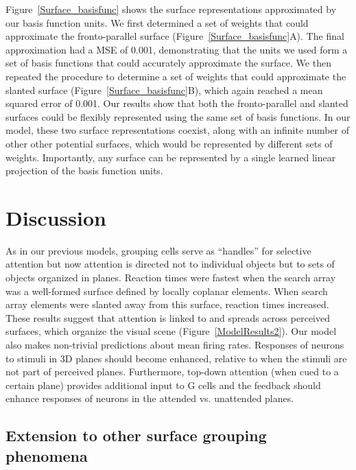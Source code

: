 Figure~\ref{Surface_basisfunc} shows the surface representations approximated by our basis function units. We first determined a set of weights that could approximate the fronto-parallel surface (Figure~\ref{Surface_basisfunc}A). The final approximation had a MSE of 0.001, demonstrating that the units we used form a set of basis functions that could accurately approximate the surface. We then repeated the procedure to determine a set of weights that could approximate the slanted surface (Figure~\ref{Surface_basisfunc}B), which again reached a mean squared error of 0.001. Our results show that both the fronto-parallel and slanted surfaces could be flexibly represented using the same set of basis functions. In our model, these two surface representations coexist, along with an infinite number of other other potential surfaces, which would be represented by different sets of weights. Importantly, any surface can be represented by a single learned linear projection of the basis function units.

\section{Discussion}

As in our previous models, grouping cells serve as “handles” for selective attention but now attention is directed not to individual objects but to sets of objects organized in planes. Reaction times were fastest when the search array was a well-formed surface defined by locally coplanar elements. When search array elements were slanted away from this surface, reaction times increased. These results suggest that attention is linked to and spreads across perceived surfaces, which organize the visual scene
(Figure~\ref{ModelResults2}). Our model also makes non-trivial predictions about mean firing rates. Responses of neurons to stimuli in 3D planes should become enhanced, relative to when the stimuli are not part of perceived planes. Furthermore, top-down attention (when cued to a certain plane) provides additional input to G cells and the feedback should enhance responses of neurons in the attended vs. unattended planes.

\subsection{Extension to other surface grouping phenomena}

